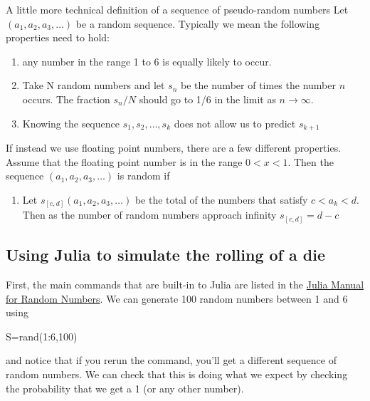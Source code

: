 A little more technical definition of a sequence of pseudo-random
numbers Let\\ $(a_1,a_2,a_3, \ldots)$ be a random sequence. Typically we
mean the following properties need to hold:

\begin{enumerate}
\def\labelenumi{\arabic{enumi}.}

\item
  any number in the range 1 to 6 is equally likely to occur.
\item
  Take N random numbers and let $s_n$ be the number of times the
  number $n$ occurs. The fraction $s_n/N$ should go to 1/6 in the
  limit as $n\rightarrow \infty$.
\item
  Knowing the sequence $s_1, s_2, \ldots, s_k$ does not allow us to
  predict $s_{k+1}$
\end{enumerate}

If instead we use floating point numbers, there are a few different
properties. Assume that the floating point number is in the range
$0 < x < 1$. Then the sequence $(a_1,a_2,a_3, \ldots)$ is random
if

\begin{enumerate}
\def\labelenumi{\arabic{enumi}.}
\setcounter{enumi}{2}

\item
  Let $s_{[c,d]}(a_1,a_2,a_3, \ldots)$ be the total of the numbers
  that satisfy $c < a_k < d$. Then as the number of random numbers
  approach infinity $s_{[c,d]}=d-c$
\end{enumerate}

\hypertarget{using-julia-to-simulate-the-rolling-of-a-die}{%
\subsection{Using Julia to simulate the rolling of a
die}\label{using-julia-to-simulate-the-rolling-of-a-die}}

First, the main commands that are built-in to Julia are listed in the
\href{https://docs.julialang.org/en/latest/stdlib/Random/#Random-Numbers-1}{Julia
Manual for Random Numbers}. We can generate 100 random numbers between 1
and 6 using
%
\begin{jlblock}
S=rand(1:6,100)
\end{jlblock}
%
and notice that if you rerun the command, you'll get a different
sequence of random numbers. We can check that this is doing what we
expect by checking the probability that we get a 1 (or any other
number).

